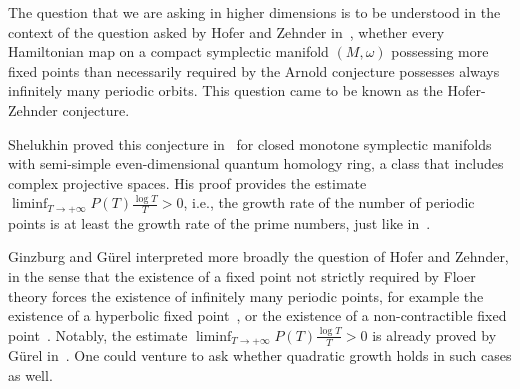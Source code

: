 \documentclass[11pt]{article}
\theoremstyle{definition}
\begin{document}
The question that we are asking in higher dimensions is to be understood in the context of the question asked by Hofer and Zehnder in~\cite[p.~263]{HZ}, whether every Hamiltonian map on a compact symplectic manifold $(M,\omega)$ possessing more fixed points than necessarily required by the Arnold conjecture possesses always infinitely many periodic orbits. This question came to be known as the Hofer-Zehnder conjecture. 

Shelukhin proved this conjecture in~\cite{Shelukhin} for closed monotone symplectic manifolds with semi-simple even-dimensional quantum homology ring, a class that includes complex projective spaces. His proof provides the estimate $\liminf_{T\to+\infty} P(T) \frac{\log T}{T}>0$, i.e., the growth rate of the number of periodic points is at least the growth rate of the prime numbers, just like in~\cite{Hingston1993}. 

Ginzburg and G\"urel interpreted more broadly the question of Hofer and Zehnder, in the sense that the existence of a fixed point not strictly required by Floer theory forces the existence of infinitely many periodic points, for example the existence of a hyperbolic fixed point~\cite{Ginzburg-Gurel2014}, or the existence of a non-contractible fixed point~\cite{Gurel2013,Ginzburg-Gurel2016}. Notably, the estimate $\liminf_{T\to+\infty} P(T) \frac{\log T}{T}>0$ is already proved by G\"urel in~\cite{Gurel2013}. One could venture to ask whether quadratic growth holds in such cases as well. 







\end{document}
